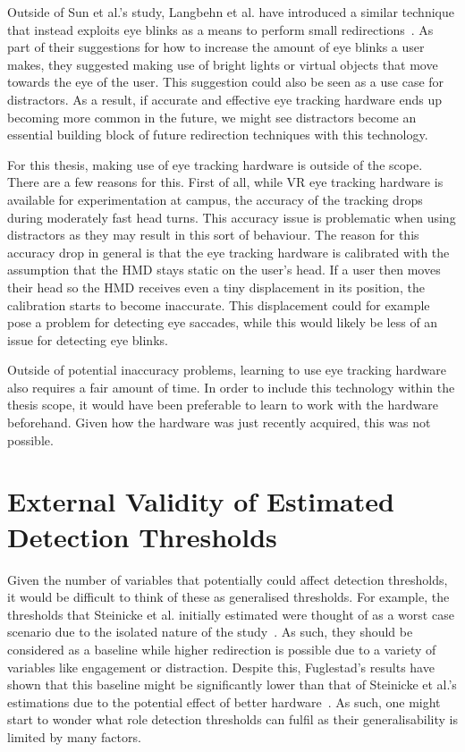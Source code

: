 Outside of Sun et al.'s study, Langbehn et al. have introduced a similar technique that instead exploits eye blinks as a means to perform small redirections~\cite{langbehn2018blink}. As part of their suggestions for how to increase the amount of eye blinks a user makes, they suggested making use of bright lights or virtual objects that move towards the eye of the user. This suggestion could also be seen as a use case for distractors. As a result, if accurate and effective eye tracking hardware ends up becoming more common in the future, we might see distractors become an essential building block of future redirection techniques with this technology. 

For this thesis, making use of eye tracking hardware is outside of the scope. There are a few reasons for this. First of all, while VR eye tracking hardware is available for experimentation at campus, the accuracy of the tracking drops during moderately fast head turns. This accuracy issue is problematic when using distractors as they may result in this sort of behaviour. The reason for this accuracy drop in general is that the eye tracking hardware is calibrated with the assumption that the HMD stays static on the user's head. If a user then moves their head so the HMD receives even a tiny displacement in its position, the calibration starts to become inaccurate. This displacement could for example pose a problem for detecting eye saccades, while this would likely be less of an issue for detecting eye blinks. 

Outside of potential inaccuracy problems, learning to use eye tracking hardware also requires a fair amount of time. In order to include this technology within the thesis scope, it would have been preferable to learn to work with the hardware beforehand. Given how the hardware was just recently acquired, this was not possible.

\section{External Validity of Estimated Detection Thresholds}
Given the number of variables that potentially could affect detection thresholds, it would be difficult to think of these as generalised thresholds. For example, the thresholds that Steinicke et al. initially estimated were thought of as a worst case scenario due to the isolated nature of the study~\cite{5072212}. As such, they should be considered as a baseline while higher redirection is possible due to a variety of variables like engagement or distraction. Despite this, Fuglestad's results have shown that this baseline might be significantly lower than that of Steinicke et al.'s estimations due to the potential effect of better hardware~\cite{fuglestad2018redirected}. As such, one might start to wonder what role detection thresholds can fulfil as their generalisability is limited by many factors.  

